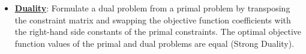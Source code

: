 \documentclass{article}%
\begin{document}
\begin{itemize}[leftmargin=*]
\item \href{https://www.math.purdue.edu/~yipn/421/2024-12-03-Duality.pdf#page=1}{\textbf{Duality}}: Formulate a dual problem from a primal problem by transposing the constraint matrix and swapping the objective function coefficients with the right-hand side constants of the primal constraints. The optimal objective function values of the primal and dual problems are equal (Strong Duality).%
\end{itemize}

%
\end{document}
